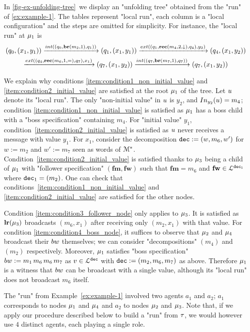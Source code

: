 \begin{example}
	In \cref{fig-ex-unfolding-tree}~we display an "unfolding tree" obtained from the "run" of \cref{ex:example-1}. The tables represent "local run", each column is a "local configuration" and the steps are omitted for simplicity. For instance, the "local run" at $\mu_1$ is \begin{multline*}
	(q_0, (x_1,y_1)) \intstep{(q_0, \br{m_2}{1},q_1)} (q_1, (x_1, y_1)) \extbr{(q_1, \rec{m_4}{2}{\enregact}, q_4)}{y_2} (q_4, (x_1, y_2)) \\ \extbr{(q_4, \rec{m_6}{1}{\eqtestact}, q_7)}{x_1} (q_7, (x_1, y_2)) \intstep{(q_7, \br{m_7}{1},q_7)} (q_7, (x_1, y_2)) \end{multline*}
	
	We explain why conditions \ref{item:condition1_non_initial_value} and \ref{item:condition2_initial_value} are satisfied at the root $\mu_1$ of the tree. Let $u$ denote its "local run".
	The only "non-initial value" in $u$ is $y_2$, and $\vinput{y_2}{\localrun} = m_4$; condition \ref{item:condition1_non_initial_value} is satisfied as $\mu_1$ has a boss child with a "boss specification" containing $m_4$. 
	For "initial value" $y_1$, condition~\ref{item:condition2_initial_value} is satisfied as $u$ never receives a message with value $y_1$. For $x_1$, consider the decomposition $\mathtt{dec} := (w, m_6, w')$ for $w:= m_2$ and $w' := m_7$ seen as words of $\mathcal{M}^*$. Condition~\ref{item:condition2_initial_value} is satisfied thanks to $\mu_3$ being a child of $\mu_1$ with "follower specification" $(\mathbf{fm}, \mathbf{fw})$ such that $\mathbf{fm} = m_6$ and $\mathbf{fw} \in \mathcal{L}^{\mathtt{\mathtt{dec}_1}}$ where $\mathtt{dec}_1 = (m_2)$. One can check that conditions~\ref{item:condition1_non_initial_value} and \ref{item:condition2_initial_value} are satisfied for the other nodes. 
	
	Condition \ref{item:condition3_follower_node} only applies to $\mu_3$. It is satisfied as $\mathbf{lr}(\mu_3)$ broadcasts $(m_6,x_1)$ after receiving only $(m_2,x_1)$ with that value. 
	For condition \ref{item:condition4_boss_node}, it suffices to observe that $\mu_2$ and $\mu_4$ broadcast their $\bossspec$ themselves; we can consider "decompositions" $(m_4)$ and $(m_2)$ respectively. Moreover, $\mu_1$ satisfies "boss specification" $\bossspec:= m_1 \, m_6 \, m_6 \, m_7$ as $v \in \mathcal{L}^{\mathtt{\mathtt{dec}}}$ with $\mathtt{dec} := (m_2, m_6, m_7)$ as above. Therefore $\mu_1$ is a witness that $\bossspec$ can be broadcast with a single value, although its "local run" does not broadcast $m_6$ itself. 
	
	The "run" from Example~\ref{ex:example-1} involved two agents $a_1$ and $a_2$; $a_1$ corresponds to nodes $\mu_1$ and $\mu_4$ and $a_2$ 
	to nodes $\mu_2$ and $\mu_3$. Note that, if we apply our procedure described below to build a "run" from $\tau$, we would however use $4$ distinct agents, each playing a single role.
\end{example}


